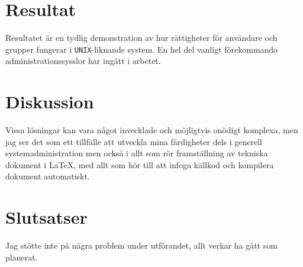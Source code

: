 %
%
%


\section{Resultat}
Resultatet är en tydlig demonstration av hur rättigheter för användare och
grupper fungerar i \texttt{UNIX}-liknande system. En hel del vanligt förekommando
administrationssysslor har ingått i arbetet.

\section{Diskussion}
Vissa lösningar kan vara något invecklade och möjligtvis onödigt komplexa,
men jag ser det som ett tillfälle att utveckla mina färdigheter dels i generell
systemadministration men också i allt som rör framställning av tekniska dokument
i \LaTeX , med allt som hör till att infoga källkod och kompilera dokument
automatiskt.


\section{Slutsatser}
Jag stötte inte på några problem under utförandet, allt verkar ha gått som
planerat.

